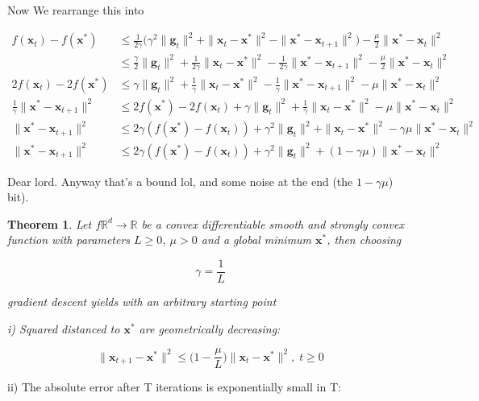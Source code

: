 \documentclass{article}
\newtheorem{theorem}{Theorem}[section]
\begin{document}
	Now We rearrange this into 

	\begin{align*}
		f(\mathbf{x}_t) - f(\mathbf{x}^*)   &\le \frac{1}{2\gamma}\big( \gamma^2\|\mathbf{g}_t\|^2 + \|\mathbf{x}_t - \mathbf{x}^*\|^2 - \| \mathbf{x}^* - \mathbf{x}_{t+1} \|^2 \big) - \frac{\mu}{2} \|\mathbf{x}^*-\mathbf{x}_t\|^2 \\
		&\le  \frac{\gamma}{2}\|\mathbf{g}_t\|^2 + \frac{1}{2\gamma}\|\mathbf{x}_t - \mathbf{x}^*\|^2 - \frac{1}{2\gamma}\| \mathbf{x}^* - \mathbf{x}_{t+1} \|^2 - \frac{\mu}{2} \|\mathbf{x}^*-\mathbf{x}_t\|^2 \\
		2f(\mathbf{x}_t) - 2f(\mathbf{x}^*) &\le  \gamma\|\mathbf{g}_t\|^2 + \frac{1}{\gamma}\|\mathbf{x}_t - \mathbf{x}^*\|^2 - \frac{1}{\gamma}\| \mathbf{x}^* - \mathbf{x}_{t+1} \|^2 - \mu \|\mathbf{x}^*-\mathbf{x}_t\|^2 \\
		 \frac{1}{\gamma}\| \mathbf{x}^* - \mathbf{x}_{t+1} \|^2&\le  2f(\mathbf{x}^*) -2f(\mathbf{x}_t) +  \gamma\|\mathbf{g}_t\|^2 + \frac{1}{\gamma}\|\mathbf{x}_t - \mathbf{x}^*\|^2  - \mu \|\mathbf{x}^*-\mathbf{x}_t\|^2 \\
		\| \mathbf{x}^* - \mathbf{x}_{t+1} \|^2&\le  2\gamma(f(\mathbf{x}^*) -f(\mathbf{x}_t))  +  \gamma^2\|\mathbf{g}_t\|^2 + \|\mathbf{x}_t - \mathbf{x}^*\|^2  - \gamma\mu \|\mathbf{x}^*-\mathbf{x}_t\|^2 \\
		\| \mathbf{x}^* - \mathbf{x}_{t+1} \|^2&\le  2\gamma(f(\mathbf{x}^*) -f(\mathbf{x}_t))  + \gamma^2\|\mathbf{g}_t\|^2 + (1- \gamma\mu) \|\mathbf{x}^*-\mathbf{x}_t\|^2 
	\end{align*}
	
	Dear lord. Anyway that's a bound lol, and some noise at the end (the $1-\gamma\mu$) bit).
	
	\begin{theorem}
		Let $f\mathbb{R}^d\to\mathbb{R}$ be a convex differentiable smooth and strongly convex function with parameters $L \ge 0$, $\mu > 0$ and a global minimum $\mathbf{x^*}$, then choosing
		
		\[ \gamma = \frac{1}{L} \]
		
		gradient descent yields with an arbitrary starting point
		
		i) Squared distanced to $\mathbf{x^*}$ are geometrically decreasing:
		
		\[ \|\mathbf{x}_{t+1} - \mathbf{x^*} \|^2 \le \bigg( 1-\frac{\mu}{L}\bigg)\|\mathbf{x}_t - \mathbf{x}^*\|^2, \; t\ge 0 \]
	\end{theorem}

		ii) The absolute error after T iterations is exponentially small in T:
		
\end{document}
